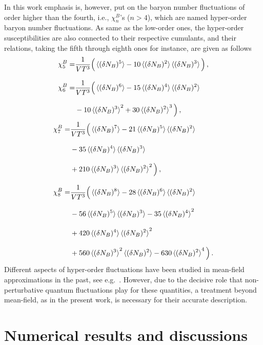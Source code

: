 \documentclass[%
reprint,
superscriptaddress,
showpacs,preprintnumbers,
amsmath,amssymb,
aps,
prd,
]{revtex4-1}
\begin{document}
	In this work emphasis is, however, put on the baryon number fluctuations of order higher than the fourth, i.e., $\chi_n^{B}$'s ($n>4$), which are named hyper-order baryon number fluctuations. As same as the low-order ones, the hyper-order susceptibilities are also connected to their respective cumulants, and their relations, taking the fifth through eighth ones for instance, are given as follows
	\begin{align}
		\chi^B_5=&\frac{1}{VT^3}\Big(\braket{(\delta N_B)^5}-10\braket{(\delta N_B)^2}\braket{(\delta N_B)^3}\Big)\,,\\[2ex]
		\chi^B_6=&\frac{1}{VT^3}\Big(\braket{(\delta N_B)^6}-15\braket{(\delta N_B)^4}\braket{(\delta N_B)^2}\nonumber\\[2ex]
		&-10\braket{(\delta N_B)^3}^2+30\braket{(\delta N_B)^2}^3\Big)\,,
	\end{align}
	\begin{align}
		\chi^B_7=&\frac{1}{VT^3}\Big(\braket{(\delta N_B)^7}-21\braket{(\delta N_B)^5}\braket{(\delta N_B)^2}\nonumber\\[2ex]
		&-35\braket{(\delta N_B)^4}\braket{(\delta N_B)^3}\nonumber\\[2ex]
		&+210\braket{(\delta N_B)^3}\braket{(\delta N_B)^2}^2\Big)\,,\\[2ex]
		\chi^B_8=&\frac{1}{VT^3}\Big(\braket{(\delta N_B)^8}-28\braket{(\delta N_B)^6}\braket{(\delta N_B)^2}\nonumber\\[2ex]
		&-56\braket{(\delta N_B)^5}\braket{(\delta N_B)^3}-35\braket{(\delta N_B)^4}^2\nonumber\\[2ex]
		&+420\braket{(\delta N_B)^4}\braket{(\delta N_B)^2}^2\nonumber\\[2ex]
		&+560\braket{(\delta N_B)^3}^2\braket{(\delta N_B)^2}-630\braket{(\delta N_B)^2}^4\Big)\,.
	\end{align}
	Different aspects of hyper-order fluctuations have been studied in mean-field approximations in the past, see e.g.\ \cite{Wagner:2009pm, Karsch:2010hm, Schaefer:2011ex}. However, due to the decisive role that non-perturbative quantum fluctuations play for these quantities, a treatment beyond mean-field, as in the present work, is necessary for their accurate description.
	
	
	
	\section{Numerical results and discussions}
	\label{sec:num}
	
\end{document}
